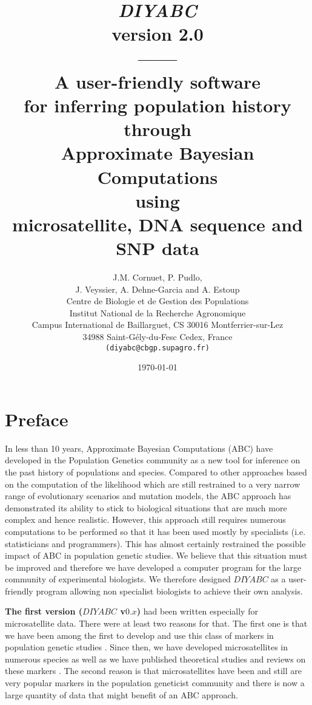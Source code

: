 \documentclass [a4paper]{report}
\title{\Huge \emph{\textbf{DIYABC}} \\ 
version 2.0\\
------\\ 
A user-friendly software \\  
for inferring population history  through \\ 
Approximate Bayesian Computations\\
using\\ 
microsatellite, DNA sequence and SNP data}
\author{
\Large J.M. Cornuet, P. Pudlo,\\ 
\Large J. Veyssier, A. Dehne-Garcia and A. Estoup\\
\vspace{6.0cm}
Centre de Biologie et de Gestion des Populations\\
Institut National de la Recherche Agronomique\\
Campus International de Baillarguet, CS 30016 Montferrier-sur-Lez\\
34988 Saint-G\'ely-du-Fesc Cedex, France\\
\texttt{(diyabc@cbgp.supagro.fr)}}
\date{\today}
\let\sectionv\section
\renewcommand{\section}[1]{\sectionv{#1} \setcounter{paragraph}{0}}
\begin{document}
\maketitle %
\pagestyle{myheadings}
\begin{doublespacing}
\setcounter{tocdepth}{4}
\tableofcontents
\end{doublespacing}
\newpage
\section{Preface}
In less than 10 years, Approximate Bayesian Computations (ABC) have developed in the Population Genetics community as a new tool for inference on the past history of populations and species. Compared to other approaches based on the computation of the likelihood which are still restrained to a very narrow range of evolutionary scenarios and mutation models, the ABC approach has demonstrated its ability to stick to biological situations that are much more complex and hence realistic. However, this approach still requires numerous computations to be performed so that it has been used mostly by specialists (i.e. statisticians and programmers). This has almost certainly restrained the possible impact of ABC in population genetic studies. We believe that this situation must be improved and therefore we have developed a computer program for the large community of experimental biologists. We therefore designed $DIYABC$ as a user-friendly program allowing non specialist biologists to achieve their own analysis.\

\textbf{The first version ($DIYABC$ v$0.x$)} had been written especially for microsatellite data. There were at least two reasons for that. The first one is that we have been among the first to develop and use this class of markers in population genetic studies \citep[e.g.][]{E1993}. Since then, we have developed microsatellites in numerous species as well as we have published theoretical studies and reviews on these markers \citep[e.g.][]{E2002}. The second reason is that microsatellites have been and still are very popular markers in the population geneticist community and there is now a large quantity of data that might benefit of an ABC approach.\
\end{document}
